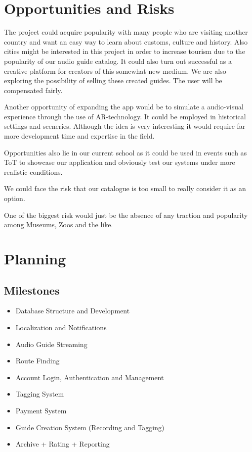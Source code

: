 \documentclass[12pt]{article}
\theoremstyle{definition}
\newenvironment{text}{
}{}
\begin{document}
\section{Opportunities and Risks}
\begin{text}
The project could acquire popularity with many people who are visiting another country and want an easy way to learn about customs, culture and history.
Also cities might be interested in this project in order to increase tourism due to the popularity of our audio guide catalog.
It could also turn out successful as a creative platform for creators of this somewhat new medium. We are also exploring the possibility of selling these created guides. The user will be compensated fairly.\newline
 
Another opportunity of expanding the app would be to simulate a audio-visual experience through the use of AR-technology. It could be employed in historical settings and sceneries. Although the idea is very interesting it would require far more development time and expertise in the field.\newline

Opportunities also lie in our current school as it could be used in events such as ToT to showcase our application and obviously test our systems under more realistic conditions.
 
We could face the risk that our catalogue is too small to really consider it as an option.\newline 
 
One of the biggest risk would just be the absence of any traction and popularity among Museums, Zoos and the like. \newline
 
\end{text}
 
\pagebreak
\section{Planning}

\subsection{Milestones}
\begin{itemize}
\item Database Structure and Development
\item Localization and Notifications
\item Audio Guide Streaming
\item Route Finding
\item Account Login, Authentication and Management
\item Tagging System
\item Payment System
\item Guide Creation System (Recording and Tagging)
\item Archive + Rating + Reporting
\end{itemize}
\end{document}
